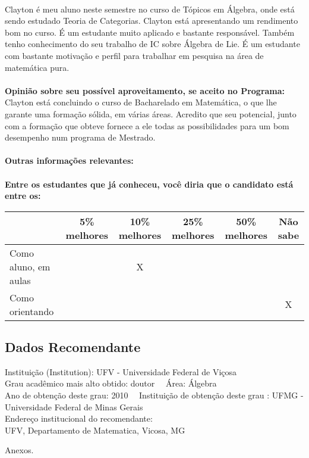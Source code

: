 \documentclass[11pt]{article}
\begin{document}
\\Clayton é meu aluno neste semestre no curso de Tópicos em Álgebra, onde está sendo estudado Teoria de Categorias. Clayton está apresentando um rendimento bom no curso. É um estudante muito aplicado e bastante responsável. Também tenho conhecimento do seu trabalho de IC sobre Álgebra de Lie. É um estudante com bastante motivação e perfil para trabalhar em pesquisa na área de matemática pura.\\
\\
\textbf{Opinião sobre seu possível aproveitamento, se aceito no Programa:}
\\Clayton está concluindo o curso de Bacharelado em Matemática, o que lhe garante uma formação sólida, em várias áreas. Acredito que seu potencial, junto com a formação que obteve fornece a ele todas as possibilidades para um bom desempenho num programa de Mestrado.\\ 
\\
\textbf{Outras informações relevantes:} \\
\\[0.3cm]
\textbf{Entre os estudantes que já conheceu, você diria que o candidato está entre os:}
\\
\begin{tabular}{|l|c|c|c|c|c|}
\hline
 & 5\% melhores & 10\% melhores & 25\% melhores & 50\% melhores & Não sabe \\
\hline
Como aluno, em aulas &  & X &  &  & \\
\hline
Como orientando &  &  &  &  & X\\
\hline
\end{tabular}
\subsection*{Dados Recomendante} 
	Instituição (Institution): UFV - Universidade Federal de Viçosa
\\ 
	Grau acadêmico mais alto obtido: doutor
	\ \ Área: Álgebra
	\\
	Ano de obtenção deste grau: 2010
	\ \ 
	Instituição de obtenção deste grau : UFMG - Universidade Federal de Minas Gerais
	\\ 
	Endereço institucional do recomendante: \\ UFV, Departamento de Matematica, Vicosa, MG 
\begin{center}
Anexos.
\end{center}
\end{document}
